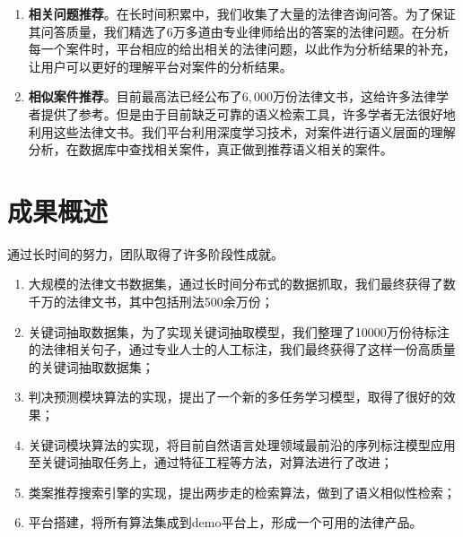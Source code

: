 \begin{enumerate}[1)]
	\item \textbf{相关问题推荐}。在长时间积累中，我们收集了大量的法律咨询问答。为了保证其问答质量，我们精选了$6$万多道由专业律师给出的答案的法律问题。在分析每一个案件时，平台相应的给出相关的法律问题，以此作为分析结果的补充，让用户可以更好的理解平台对案件的分析结果。
	\item \textbf{相似案件推荐}。目前最高法已经公布了$6,000$万份法律文书，这给许多法律学者提供了参考。但是由于目前缺乏可靠的语义检索工具，许多学者无法很好地利用这些法律文书。我们平台利用深度学习技术，对案件进行语义层面的理解分析，在数据库中查找相关案件，真正做到推荐语义相关的案件。
	\end{enumerate}



\section{成果概述}

通过长时间的努力，团队取得了许多阶段性成就。


\begin{enumerate}[1)]
	\item 大规模的法律文书数据集，通过长时间分布式的数据抓取，我们最终获得了数千万的法律文书，其中包括刑法500余万份；

	\item 关键词抽取数据集，为了实现关键词抽取模型，我们整理了10000万份待标注的法律相关句子，通过专业人士的人工标注，我们最终获得了这样一份高质量的关键词抽取数据集；

	\item 判决预测模块算法的实现，提出了一个新的多任务学习模型，取得了很好的效果；

	\item 关键词模块算法的实现，将目前自然语言处理领域最前沿的序列标注模型应用至关键词抽取任务上，通过特征工程等方法，对算法进行了改进；

	\item 类案推荐搜索引擎的实现，提出两步走的检索算法，做到了语义相似性检索；

	\item 平台搭建，将所有算法集成到demo平台上，形成一个可用的法律产品。
\end{enumerate}


